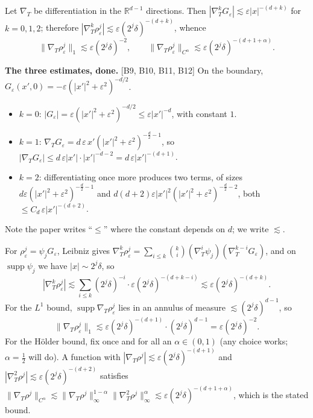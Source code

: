 \documentclass[11pt,reqno]{amsart}
\theoremstyle{plain}
\theoremstyle{definition}
\theoremstyle{plain}
\theoremstyle{definition}
\theoremstyle{remark}
\newcommand{\Rdm}{\mathbb{R}^{d-1}}
\DeclareMathOperator{\supp}{supp}
\newcommand{\Ledger}[1]{{\scriptsize\textsf{[#1]}}}
\begin{document}
Let $\nabla_T$ be differentiation in the $\Rdm$ directions. Then
$|\nabla_T^kG_\varepsilon|\lesssim\varepsilon|x|^{-(d+k)}$ for $k=0,1,2$; therefore
$|\nabla_T^k\rho^j_\varepsilon|\lesssim\varepsilon(2^j\delta)^{-(d+k)}$, whence
\[\|\nabla_T\rho^j_\varepsilon\|_1\lesssim\varepsilon(2^j\delta)^{-2},
  \qquad
  \|\nabla_T\rho^j_\varepsilon\|_{C^\alpha}\lesssim\varepsilon(2^j\delta)^{-(d+1+\alpha)} .\]

\begin{expansion}
\textbf{The three estimates, done.} \Ledger{B9, B10, B11, B12}
On the boundary, $G_\varepsilon(x',0)=-\varepsilon(|x'|^2+\varepsilon^2)^{-d/2}$.
\begin{itemize}[leftmargin=1.4em,itemsep=2pt]
\item $k=0$: $|G_\varepsilon|=\varepsilon(|x'|^2+\varepsilon^2)^{-d/2}
  \le\varepsilon|x'|^{-d}$, with constant $1$.
\item $k=1$: $\nabla_TG_\varepsilon
  =d\,\varepsilon\,x'(|x'|^2+\varepsilon^2)^{-\frac d2-1}$, so
  $|\nabla_TG_\varepsilon|\le d\,\varepsilon|x'|\cdot|x'|^{-d-2}
  =d\,\varepsilon|x'|^{-(d+1)}$.
\item $k=2$: differentiating once more produces two terms, of sizes
  $d\varepsilon(|x'|^2+\varepsilon^2)^{-\frac d2-1}$ and
  $d(d+2)\varepsilon|x'|^2(|x'|^2+\varepsilon^2)^{-\frac d2-2}$, both
  $\le C_d\,\varepsilon|x'|^{-(d+2)}$.
\end{itemize}
Note the paper writes ``$\le$'' where the constant depends on $d$; we write
$\lesssim$.

For $\rho^j_\varepsilon=\psi_jG_\varepsilon$, Leibniz gives
$\nabla_T^k\rho^j_\varepsilon=\sum_{i\le k}\binom ki
 (\nabla_T^i\psi_j)(\nabla_T^{k-i}G_\varepsilon)$, and on $\supp\psi_j$ we have
$|x|\sim2^j\delta$, so
\[|\nabla_T^k\rho^j_\varepsilon|
 \lesssim\sum_{i\le k}(2^j\delta)^{-i}\cdot\varepsilon(2^j\delta)^{-(d+k-i)}
 \lesssim\varepsilon(2^j\delta)^{-(d+k)} .\]
For the $L^1$ bound, $\supp\nabla_T\rho^j_\varepsilon$ lies in an annulus of measure
$\lesssim(2^j\delta)^{d-1}$, so
\[\|\nabla_T\rho^j_\varepsilon\|_1
 \lesssim\varepsilon(2^j\delta)^{-(d+1)}\cdot(2^j\delta)^{d-1}
 =\varepsilon(2^j\delta)^{-2}. \]
For the H\"older bound, fix once and for all an $\alpha\in(0,1)$ (any choice works;
$\alpha=\frac12$ will do). A function with
$|\nabla_T\rho^j|\lesssim\varepsilon(2^j\delta)^{-(d+1)}$ and
$|\nabla_T^2\rho^j|\lesssim\varepsilon(2^j\delta)^{-(d+2)}$ satisfies
$\|\nabla_T\rho^j\|_{C^\alpha}\lesssim
 \|\nabla_T\rho^j\|_\infty^{1-\alpha}\|\nabla^2_T\rho^j\|_\infty^{\alpha}
 \lesssim\varepsilon(2^j\delta)^{-(d+1+\alpha)}$, which is the stated bound.
\end{expansion}
\end{document}
